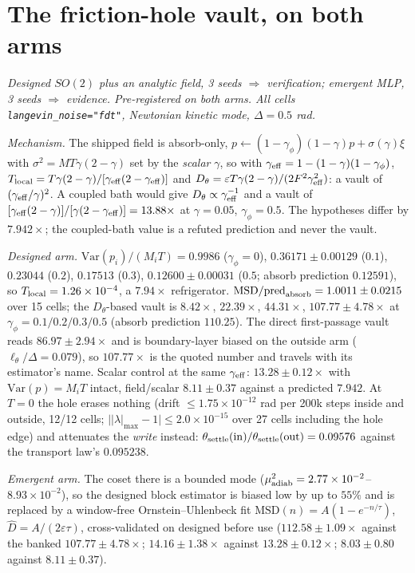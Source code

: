\documentclass{article}
\begin{document}
\section{The friction-hole vault, on both arms}\label{app:vault}

\emph{Designed $SO(2)$ plus an analytic field, 3 seeds $\Rightarrow$ verification; emergent MLP, 3 seeds $\Rightarrow$ evidence. Pre-registered on both arms. All cells \texttt{langevin\_noise="fdt"}, Newtonian kinetic mode, $\Delta=0.5$ rad.}

\emph{Mechanism.} The shipped field is absorb-only, $p\leftarrow(1-\gamma_\phi)(1-\gamma)p+\sigma(\gamma)\xi$ with $\sigma^2=MT\gamma(2-\gamma)$ set by the \emph{scalar} $\gamma$, so with $\gamma_{\rm eff}=1-(1-\gamma)(1-\gamma_\phi)$, $T_{\rm local}=T\gamma(2-\gamma)/[\gamma_{\rm eff}(2-\gamma_{\rm eff})]$ and $D_\theta=\varepsilon T\gamma(2-\gamma)/(2F^2\gamma_{\rm eff}^2)$: a vault of $(\gamma_{\rm eff}/\gamma)^2$. A coupled bath would give $D_\theta\propto\gamma_{\rm eff}^{-1}$ and a vault of $[\gamma_{\rm eff}(2-\gamma)]/[\gamma(2-\gamma_{\rm eff})]=13.88\times$ at $\gamma=0.05$, $\gamma_\phi=0.5$. The hypotheses differ by $7.942\times$; the coupled-bath value is a refuted prediction and never the vault.

\emph{Designed arm.} $\mathrm{Var}(p_i)/(M_iT)=0.9986$ ($\gamma_\phi=0$), $0.36171\pm0.00129$ ($0.1$), $0.23044$ ($0.2$), $0.17513$ ($0.3$), $0.12600\pm0.00031$ ($0.5$; absorb prediction $0.12591$), so $T_{\rm local}=1.26\times10^{-4}$, a $7.94\times$ refrigerator. $\mathrm{MSD}/\text{pred}_{\rm absorb}=1.0011\pm0.0215$ over 15 cells; the $D_\theta$-based vault is $8.42\times$, $22.39\times$, $44.31\times$, $107.77\pm4.78\times$ at $\gamma_\phi=0.1/0.2/0.3/0.5$ (absorb prediction $110.25$). The direct first-passage vault reads $86.97\pm2.94\times$ and is boundary-layer biased on the outside arm ($\ell_\theta/\Delta=0.079$), so $107.77\times$ is the quoted number and travels with its estimator's name. Scalar control at the same $\gamma_{\rm eff}$: $13.28\pm0.12\times$ with $\mathrm{Var}(p)=M_iT$ intact, field/scalar $8.11\pm0.37$ against a predicted $7.942$. At $T=0$ the hole erases nothing (drift $\le1.75\times10^{-12}$ rad per 200k steps inside and outside, 12/12 cells; $\big||\lambda|_{\max}-1\big|\le2.0\times10^{-15}$ over 27 cells including the hole edge) and attenuates the \emph{write} instead: $\theta_{\rm settle}({\rm in})/\theta_{\rm settle}({\rm out})=0.09576$ against the transport law's $0.095238$.

\emph{Emergent arm.} The coset there is a bounded mode ($\mu^2_{\rm adiab}=2.77\times10^{-2}$--$8.93\times10^{-2}$), so the designed block estimator is biased low by up to $55\%$ and is replaced by a window-free Ornstein--Uhlenbeck fit $\mathrm{MSD}(n)=A(1-e^{-n/\tau})$, $\hat D=A/(2\varepsilon\tau)$, cross-validated on designed before use ($112.58\pm1.09\times$ against the banked $107.77\pm4.78\times$; $14.16\pm1.38\times$ against $13.28\pm0.12\times$; $8.03\pm0.80$ against $8.11\pm0.37$).
\end{document}
